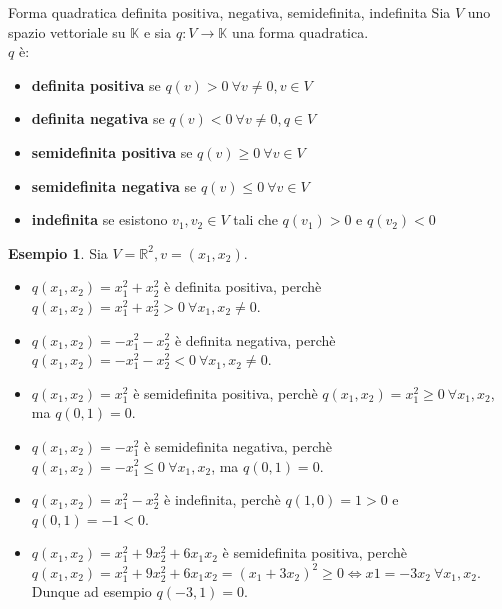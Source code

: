 \documentclass[a4paper]{article}
\theoremstyle{definition}
\newtheorem*{es}{Esempio}
\begin{document}
	\begin{deff}{Forma quadratica definita positiva, negativa, semidefinita, indefinita}{}
		Sia $V$ uno spazio vettoriale su $\mathbb{K}$ e sia $q: V \to \mathbb{K}$ una forma quadratica. \\
		$q$ è:
		\begin{itemize}
			\item \textbf{definita positiva} se $q(v) > 0 \ \forall v \ne 0, v \in V$
			\item \textbf{definita negativa} se $q(v) < 0 \ \forall v \ne 0, q \in V$
			\item \textbf{semidefinita positiva} se $q(v) \ge 0 \ \forall v \in V$
			\item \textbf{semidefinita negativa} se $q(v) \le 0 \ \forall v \in V$
			\item \textbf{indefinita} se esistono $v_1, v_2 \in V$ tali che $q(v_1) > 0$ e $q(v_2) < 0$
		\end{itemize}
	\end{deff}

	\begin{es}
		Sia $V = \mathbb{R}^2, v = (x_1, x_2)$.
		\begin{itemize}
			\item $q(x_1, x_2) = x_1^2 + x_2^2$ è definita positiva, perchè $q(x_1, x_2) = x_1^2 + x_2^2 > 0 \ \forall x_1, x_2 \ne 0$.
			\item $q(x_1, x_2) = -x_1^2 - x_2^2$ è definita negativa, perchè $q(x_1, x_2) = -x_1^2 - x_2^2 < 0 \ \forall x_1, x_2 \ne 0$.
			\item $q(x_1, x_2) = x_1^2$ è semidefinita positiva, perchè $q(x_1, x_2) = x_1^2 \ge 0 \ \forall x_1, x_2$, ma $q(0, 1) = 0$.
			\item $q(x_1, x_2) = -x_1^2$ è semidefinita negativa, perchè $q(x_1, x_2) = -x_1^2 \le 0 \ \forall x_1, x_2$, ma $q(0, 1) = 0$.
			\item $q(x_1, x_2) = x_1^2 - x_2^2$ è indefinita, perchè $q(1, 0) = 1 > 0$ e $q(0, 1) = -1 < 0$.
			\item $q(x_1, x_2) = x_1^2 + 9x_2^2 + 6x_1x_2$ è semidefinita positiva, perchè $q(x_1, x_2) = x_1^2 + 9x_2^2 + 6x_1x_2 = (x_1 + 3x_2)^2 \ge 0 \Leftrightarrow x1 = -3x_2 \ \forall x_1, x_2$.
			Dunque ad esempio $q(-3, 1) = 0$.
		\end{itemize}
	\end{es}
\end{document}
